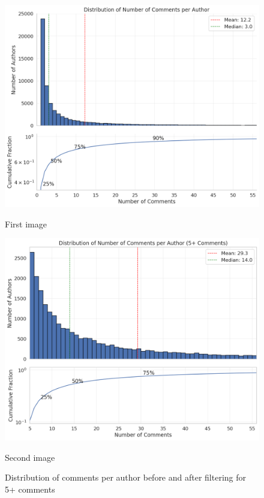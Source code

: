 \documentclass[twoside]{ctuthesis}
\theoremstyle{plain}
\theoremstyle{definition}
\theoremstyle{note}
\begin{document}
\begin{figure}[htbp]
  \centering
  \begin{minipage}[b]{0.48\linewidth}
   \centering
   \includegraphics[width=\linewidth]{figures/comments_per_author.png}
   \caption{First image}
   \label{fig:left}
  \end{minipage}
  \hfill         
  \begin{minipage}[b]{0.48\linewidth}
   \centering
   \includegraphics[width=\linewidth]{figures/comments_5_plus.png}
   \caption{Second image}
   \label{fig:right}
  \end{minipage}
  \caption{Distribution of comments per author before and after filtering for 5+ comments}
  \label{fig:pair}
 \end{figure}
\end{document}
